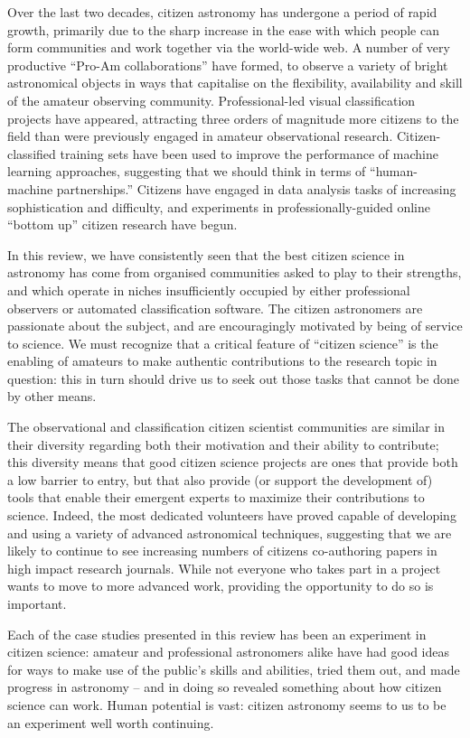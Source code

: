 \documentclass{ar2e}
\begin{document}
Over the last two decades, citizen astronomy has undergone a period of rapid
growth, primarily due to the sharp increase in the ease with which people can
form communities and work together via the world-wide web.   A number of very
productive ``Pro-Am collaborations'' have formed, to observe a variety of bright
astronomical objects in ways that capitalise on the flexibility, availability
and skill of the amateur observing community. Professional-led visual
classification projects have appeared, attracting three orders of magnitude more
citizens to the field than were previously engaged in amateur observational
research. Citizen-classified training sets have been used to improve the
performance of  machine learning approaches, suggesting that we should think in
terms of ``human-machine partnerships.'' Citizens have engaged in data analysis
tasks of increasing sophistication and difficulty, and experiments in
professionally-guided online ``bottom up'' citizen research have begun.  

In this review, we have consistently seen that the best citizen science in
astronomy has come from organised communities asked to play to their strengths,
and which operate in niches insufficiently occupied by either professional
observers or automated classification software. The citizen astronomers are
passionate about the subject, and are encouragingly motivated by being of
service to science. We must recognize that a critical feature of ``citizen
science'' is the enabling of amateurs to make authentic contributions to the
research topic in question: this in turn should drive us to seek out those tasks
that cannot be done by other means.  

The observational and classification citizen scientist communities are similar
in their diversity regarding both their motivation and their ability to
contribute;  this diversity means that good citizen science projects are ones
that provide both a low barrier to entry, but that also provide (or support the
development of) tools that enable their emergent experts to maximize their
contributions to science.  Indeed, the most dedicated volunteers have proved
capable of developing and using a variety of advanced astronomical techniques,
suggesting that we are likely to continue to see increasing numbers of citizens
co-authoring papers in high impact research journals. While not everyone who
takes part in a project wants to move to more advanced work, providing the
opportunity to do so is important.

Each of the case studies presented in this review has been an experiment in
citizen science: amateur and professional astronomers alike have had good ideas
for ways to make use of the public's skills and abilities, tried them out, and 
made progress in astronomy -- and in doing so revealed something about how
citizen science can work. Human potential is vast: citizen astronomy seems to us
to be an experiment well worth continuing. 
\end{document}
